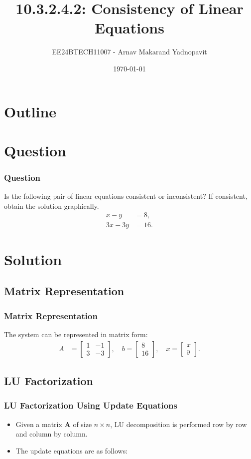 \documentclass{beamer}
\title{10.3.2.4.2: Consistency of Linear Equations}
\author{EE24BTECH11007 - Arnav Makarand Yadnopavit}
\date{\today}
\numberwithin{equation}{section}
\begin{document}
\begin{frame}
\titlepage
\end{frame}

\section*{Outline}
\begin{frame}
\tableofcontents
\end{frame}

\section{Question}
\begin{frame}
\frametitle{Question}
Is the following pair of linear equations consistent or inconsistent? If consistent, obtain the solution graphically.
\begin{align*}
    x - y &= 8, \\
    3x - 3y &= 16.
\end{align*}
\end{frame}

\section{Solution}
\subsection{Matrix Representation}
\begin{frame}
\frametitle{Matrix Representation}
The system can be represented in matrix form:
\begin{align*}
    A &= \begin{bmatrix} 1 & -1 \\ 3 & -3 \end{bmatrix}, \quad
    b = \begin{bmatrix} 8 \\ 16 \end{bmatrix}, \quad
    x = \begin{bmatrix} x \\ y \end{bmatrix}.
\end{align*}
\end{frame}

\subsection{LU Factorization}
\begin{frame}
\frametitle{LU Factorization Using Update Equations}
\begin{itemize}
    \item Given a matrix $ \mathbf{A} $ of size $ n \times n $, LU decomposition is performed row by row and column by column.
    \item The update equations are as follows:
\end{itemize}
\end{frame}
\end{document}
